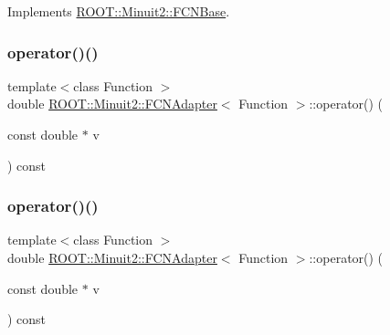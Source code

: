 Implements \mbox{\hyperlink{classROOT_1_1Minuit2_1_1FCNBase_ae4a86bd94d0d0f5ca6fc8f8ab2bb43cd}{R\+O\+O\+T\+::\+Minuit2\+::\+F\+C\+N\+Base}}.

\mbox{\label{classROOT_1_1Minuit2_1_1FCNAdapter_a9321402d626f4bdfbdbef3b63d452daf}} 
\subsubsection{\texorpdfstring{operator()()}{operator()()}\hspace{0.1cm}{\footnotesize\ttfamily [4/6]}}
{\footnotesize\ttfamily template$<$class Function $>$ \\
double \mbox{\hyperlink{classROOT_1_1Minuit2_1_1FCNAdapter}{R\+O\+O\+T\+::\+Minuit2\+::\+F\+C\+N\+Adapter}}$<$ Function $>$\+::operator() (\begin{DoxyParamCaption}\item[{const double $\ast$}]{v }\end{DoxyParamCaption}) const\hspace{0.3cm}{\ttfamily [inline]}}

\mbox{\label{classROOT_1_1Minuit2_1_1FCNAdapter_a9321402d626f4bdfbdbef3b63d452daf}} 
\subsubsection{\texorpdfstring{operator()()}{operator()()}\hspace{0.1cm}{\footnotesize\ttfamily [5/6]}}
{\footnotesize\ttfamily template$<$class Function $>$ \\
double \mbox{\hyperlink{classROOT_1_1Minuit2_1_1FCNAdapter}{R\+O\+O\+T\+::\+Minuit2\+::\+F\+C\+N\+Adapter}}$<$ Function $>$\+::operator() (\begin{DoxyParamCaption}\item[{const double $\ast$}]{v }\end{DoxyParamCaption}) const\hspace{0.3cm}{\ttfamily [inline]}}

